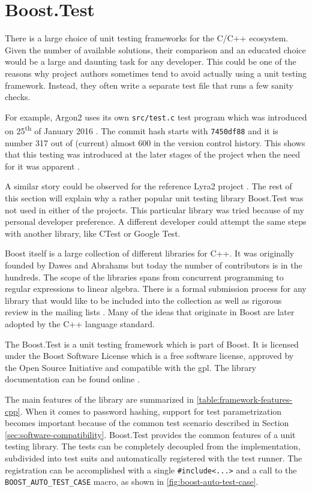 \section{Boost.Test}
\label{sec:unit-boost-google}

There is a large choice of unit testing frameworks for the C/C++ ecosystem. Given the number of available solutions, their comparison and an educated choice would be a large and daunting task for any developer. This could be one of the reasons why project authors sometimes tend to avoid actually using a unit testing framework. Instead, they often write a separate test file that runs a few sanity checks.

For example, Argon2 uses its own \texttt{src/test.c} test program which was introduced on 25\textsuperscript{th} of January 2016 \cite{github:2017:argon2}. The commit hash starts with \texttt{7450df88} and it is number 317 out of (current) almost 600 in the version control history. This shows that this testing was introduced at the later stages of the project when the need for it was apparent \cite{github:2017:argon2-issue-85}.

A similar story could be observed for the reference Lyra2 project \cite{github:2017:lyra}. The rest of this section will explain why a rather popular unit testing library Boost.Test was not used in either of the projects. This particular library was tried because of my personal developer preference. A different developer could attempt the same steps with another library, like CTest or Google Test.

Boost itself is a large collection of different libraries for C++. It was originally founded by Dawes and Abrahams but today the number of contributors is in the hundreds. The scope of the libraries spans from concurrent programming to regular expressions to linear algebra. There is a formal submission process for any library that would like to be included into the collection \cite{boost:2017:submission-process} as well as rigorous review in the mailing lists \cite{boost:2017:mailing-list}. Many of the ideas that originate in Boost are later adopted by the C++ language standard.

The Boost.Test is a unit testing framework which is part of Boost. It is licensed under the Boost Software License which is a free software license, approved by the Open Source Initiative and compatible with the \gls{gpl}. The library documentation can be found online \cite{boost:2017:test-docs}.

The main features of the library are summarized in \autoref{table:framework-features-cpp}. When it comes to password hashing, support for test parametrization becomes important because of the common test scenario described in Section \ref{sec:software-compatibility}. Boost.Test provides the common features of a unit testing library. The tests can be completely decoupled from the implementation, subdivided  into test suits and automatically registered with the test runner. The registration can be accomplished with a single \texttt{\#include<...>} and a call to the \texttt{BOOST\_AUTO\_TEST\_CASE} macro, as shown in \autoref{fig:boost-auto-test-case}.

